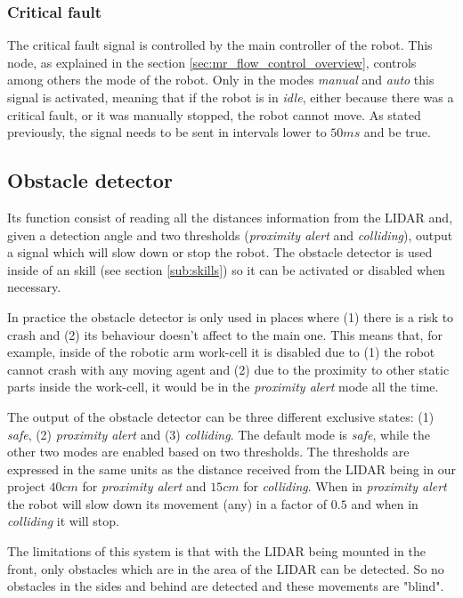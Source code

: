 		\subsubsection{Critical fault} %
		\label{ssub:mr_critical_fault}
		The critical fault signal is controlled by the main controller of the robot.
		This node, as explained in the section \ref{sec:mr_flow_control_overview}, controls among others the mode of the robot.
		Only in the modes \emph{manual} and \emph{auto} this signal is 
		activated, meaning that if the robot is in \emph{idle}, either because 
		there was a critical fault, or it was manually stopped, the robot 
		cannot move.
		As stated previously, the signal needs to be sent in intervals lower to $50ms$ and be true.

	\subsection{Obstacle detector} %
	\label{sub:mr_obstacle_detector}
	Its function consist of reading all the distances information from the LIDAR and, given a detection angle and two thresholds (\emph{proximity alert} and \emph{colliding}), output a signal which will slow down or stop the robot.
	The obstacle detector is used inside of an skill (see section \ref{sub:skills}) so it can be activated or disabled when necessary.

	In practice the obstacle detector is only used in places where (1) there is a risk to crash and (2) its behaviour doesn't affect to the main one.
	This means that, for example, inside of the robotic arm work-cell it is disabled due to (1) the robot cannot crash with any moving agent and (2) due to the proximity to other static parts inside the work-cell, it would be in the \emph{proximity alert} mode all the time. 


	The output of the obstacle detector can be three different exclusive states: (1) \emph{safe}, (2) \emph{proximity alert} and (3) \emph{colliding}. 
	The default mode is \emph{safe}, while the other two modes are enabled based on two thresholds.
	The thresholds are expressed in the same units as the distance received from the LIDAR being in our project $40cm$ for \emph{proximity alert} and $15cm$ for \emph{colliding}.
	When in \emph{proximity alert} the robot will slow down its movement (any) in a factor of $0.5$ and when in \emph{colliding} it will stop.

	The limitations of this system is that with the LIDAR being mounted in the front, only obstacles which are in the area of the LIDAR can be detected.
	So no obstacles in the sides and behind are detected and these movements are "blind".
